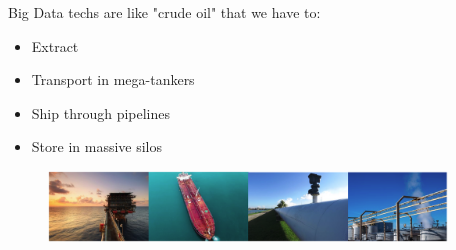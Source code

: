 \documentclass[10pt,a4paper]{article}
\begin{document}
Big Data techs are like "crude oil" that we have to:
\begin{itemize}
	\item Extract
	\item Transport in mega-tankers
	\item Ship through pipelines
	\item Store in massive silos
\end{itemize}
\begin{figure}[h!]
 \hfill \includegraphics[width=300pt]{images/crude-oil.png}\hspace*{\fill}
  \label{fig:crude-oil}
\end{figure}
\end{document}
